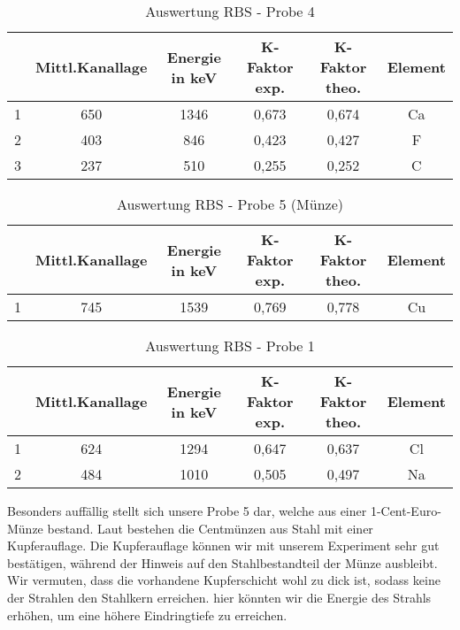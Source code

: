 \begin{table}[h]
	\caption{Auswertung RBS - Probe 4}
	\begin{tabular}{|c|c|c|c|c|c|}
	\hline
	 & Mittl.Kanallage & Energie in keV & K-Faktor exp. & K-Faktor theo. & Element \\ \hline
	   1 & 650 & 1346 & 0,673 & 0,674 & Ca\\ \hline
	   2 & 403 & 846 & 0,423 & 0,427 & F \\ \hline
	   3 & 237 & 510 & 0,255 & 0,252 & C \\ \hline
	\end{tabular}
\label{Probe4}
\end{table}

\begin{table}[h]
	\caption{Auswertung RBS - Probe 5 (Münze)}
	\begin{tabular}{|c|c|c|c|c|c|}
	\hline
	 & Mittl.Kanallage & Energie in keV & K-Faktor exp. & K-Faktor theo. & Element \\ \hline
	   1 & 745 & 1539 & 0,769 & 0,778 & Cu\\ \hline
	\end{tabular}
\label{Probe5}
\end{table}

\begin{table}[h]
	\caption{Auswertung RBS - Probe 1}
	\begin{tabular}{|c|c|c|c|c|c|}
	\hline
	 & Mittl.Kanallage & Energie in keV & K-Faktor exp. & K-Faktor theo. & Element \\ \hline
	   1 & 624 & 1294 & 0,647 & 0,637 & Cl\\ \hline
	   2 & 484 & 1010 & 0,505 & 0,497 & Na \\ \hline
	\end{tabular}
\label{Probe6}
\end{table}

Besonders auffällig stellt sich unsere Probe 5 dar, welche aus einer 1-Cent-Euro-Münze bestand. Laut \cite{muenze} bestehen die Centmünzen aus Stahl mit einer Kupferauflage. Die Kupferauflage können wir mit unserem Experiment sehr gut bestätigen, während der Hinweis auf den Stahlbestandteil der Münze ausbleibt. Wir vermuten, dass die vorhandene Kupferschicht wohl zu dick ist, sodass keine der Strahlen den Stahlkern erreichen. hier könnten wir die Energie des Strahls erhöhen, um eine höhere Eindringtiefe zu erreichen. 


